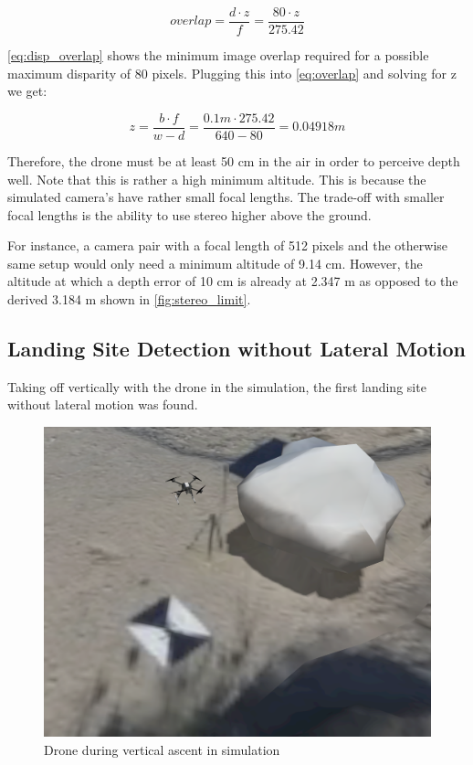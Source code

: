 \begin{equation}
    overlap = \frac{d \cdot z}{f} = \frac{80 \cdot z}{275.42}
    \label{eq:disp_overlap}
\end{equation}

\cref{eq:disp_overlap} shows the minimum image overlap required for a possible maximum disparity of 80 pixels. Plugging this into \cref{eq:overlap} and solving for z we get:

\begin{equation}
    z = \frac{b \cdot f}{w - d} = \frac{0.1 m \cdot 275.42}{640 - 80} = 0.04918 m
\end{equation}

Therefore, the drone must be at least 50 cm in the air in order to perceive depth well. Note that this is rather a high minimum altitude. This is because the simulated camera's have rather small focal lengths. The trade-off with smaller focal lengths is the ability to use stereo higher above the ground. 

For instance, a camera pair with a focal length of 512 pixels and the otherwise same setup would only need a minimum altitude of 9.14 cm. However, the altitude at which a depth error of 10 cm is already at  2.347 m as opposed to the derived
3.184 m shown in \cref{fig:stereo_limit}.

\subsection{Landing Site Detection without Lateral Motion}

Taking off vertically with the drone in the simulation, the first landing site without lateral motion was found.

\begin{figure}
    \centering
    \includegraphics[scale=0.34]{images/stereo_camera_depth/ascent_sim.png}
    \caption{Drone during vertical ascent in simulation}
\end{figure}

